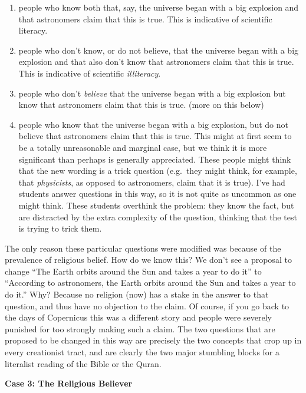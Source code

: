 \begin{enumerate}
\def\labelenumi{\arabic{enumi}.}
\itemsep1pt\parskip0pt
\item
  people who know both that, say, the universe began with a big
  explosion and that astronomers claim that this is true. This is
  indicative of scientific literacy.
\item
  people who don't know, or do not believe, that the universe began with
  a big explosion and that also don't know that astronomers claim that this
  is true. This is indicative of scientific \emph{illiteracy}.
\item
  people who don't \emph{believe} that the universe began with a big
  explosion but know that astronomers claim that this is true. (more on
  this below)
\item
  people who know that the universe began with a big explosion, but do
  not believe that astronomers claim that this is true. This might at
  first seem to be a totally unreasonable and marginal case, but we think
  it is more significant than perhaps is generally appreciated. These
  people might think that the new wording is a trick question (e.g.~they
  might think, for example, that \emph{physicists}, as opposed to astronomers, claim
  that it is true). I've had students answer questions in this way, so
  it is not quite as uncommon as one might think. These students
  overthink the problem: they know the fact, but are distracted by the
  extra complexity of the question, thinking that the test is trying to
  trick them.
\end{enumerate}

The only reason these particular questions were modified was because of
the prevalence of religious belief. How do we know this? We don't see a
proposal to change ``The Earth orbits around the Sun and takes a year to
do it'' to ``According to astronomers, the Earth orbits around the Sun
and takes a year to do it.'' Why? Because no religion (now) has a stake
in the answer to that question, and thus have no objection to the claim.
Of course, if you go back to the days of Copernicus this was a different
story and people were severely punished for too strongly making such a
claim. The two questions that are proposed to be changed in this way are
precisely the two concepts that crop up in every creationist tract, and
are clearly the two major stumbling blocks for a literalist reading of
the Bible or the Quran.

{\textbf{Case 3: The Religious Believer}}

